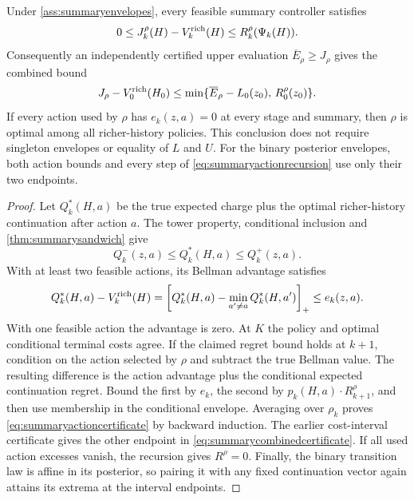 \begin{theorem}
\label{thm:summaryactioncertificate}
Under \cref{ass:summaryenvelopes}, every feasible summary controller satisfies
\begin{equation}\label{eq:summaryactioncertificate}
 0\le J_k^\rho(H)-V_k^{\rm rich}(H)
       \le R_k^\rho(\Psi_k(H)).
\end{equation}
Consequently an independently certified upper evaluation
$\overline E_\rho\ge J_\rho$ gives the combined bound
\begin{equation}\label{eq:summarycombinedcertificate}
 J_\rho-V_0^{\rm rich}(H_0)\le
 \min\{\overline E_\rho-L_0(z_0),\,R_0^\rho(z_0)\}.
\end{equation}
If every action used by $\rho$ has $e_k(z,a)=0$ at every stage and summary,
then $\rho$ is optimal among all richer-history policies. This conclusion
does not require singleton envelopes or equality of $L$ and $U$.
For the binary posterior envelopes, both action bounds and every step of
\eqref{eq:summaryactionrecursion} use only their two endpoints.
\end{theorem}
\begin{proof}
Let $Q_k^*(H,a)$ be the true expected charge plus the optimal richer-history
continuation after action $a$. The tower property, conditional inclusion
and \cref{thm:summarysandwich} give
\[
 Q_k^-(z,a)\le Q_k^*(H,a)\le Q_k^+(z,a).
\]
With at least two feasible actions, its Bellman advantage satisfies
\[
 Q_k^*(H,a)-V_k^{\rm rich}(H)
 =\left[Q_k^*(H,a)-\min_{a'\ne a}Q_k^*(H,a')\right]_+
 \le e_k(z,a).
\]
With one feasible action the advantage is zero. At $K$ the policy and
optimal conditional terminal costs agree. If the claimed regret bound
holds at $k+1$, condition on the action selected by $\rho$ and subtract the
true Bellman value. The resulting difference is the action advantage plus
the conditional expected continuation regret. Bound the first by $e_k$,
the second by $p_k(H,a)\cdot R_{k+1}^\rho$, and then use membership in the
conditional envelope. Averaging over $\rho_k$ proves
\eqref{eq:summaryactioncertificate} by backward induction.
The earlier cost-interval certificate gives the other endpoint in
\eqref{eq:summarycombinedcertificate}. If all used action excesses vanish,
the recursion gives $R^\rho=0$. Finally, the binary transition law is affine
in its posterior, so pairing it with any fixed continuation vector again
attains its extrema at the interval endpoints.
\end{proof}

